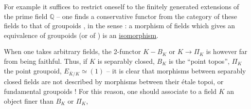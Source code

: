 For example it suffices to restrict oneself to the finitely generated extensions of the prime field $\mathbb{Q}$ -- one finds a conservative functor from the category of these fields to that of groupoids , in the sense : a morphism of fields which gives an equivalence of groupoids (or of ) is an \uline{isomorphism}.


When one takes arbitrary fields, the 2-functor $K-B_K$ or $K\longrightarrow\Pi_K$  is however far from being faithful. Thus, if $K$ is separably closed, $B_K$ is the ``point topos'', $\Pi_K$ the point groupoid, $E_{\bar K/K}\simeq(1)$ -- it is clear that morphisms between separably closed fields are not described by morphisms between their étale topoi, or fundamental groupoids ! For this reason, one should associate to a field $K$ an object finer than $B_K$ or $\Pi_K$,
